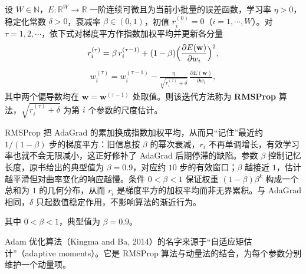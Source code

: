 \documentclass[../../main.tex]{subfiles}
\begin{document}
\begin{definition}[RMSProp]\label{definition:ch07-RMSProp}
设 $W\in\mathbb{N}$，$E:\mathbb{R}^{W}\to\mathbb{R}$ 一阶连续可微且为当前小批量的误差函数，学习率 $\eta>0$，稳定化常数 $\delta>0$，衰减率 $\beta\in(0,1)$，初值 $r_{i}^{(0)}=0$（$i=1,\cdots,W$）。对 $\tau=1,2,\cdots$，依下式对梯度平方作指数加权平均并更新各分量
\begin{align}
r_i^{(\tau)} = \beta\,r_i^{(\tau-1)}+(1-\beta)\Bigl(\frac{\partial E(\mathbf{w})}{\partial w_i}\Bigr)^{2},
\label{align:ch07-rmsprop}
\end{align}
\begin{align}
w_i^{(\tau)} = w_i^{(\tau-1)}-\frac{\eta}{\sqrt{r_i^{(\tau)}+\delta}}\,\frac{\partial E(\mathbf{w})}{\partial w_i},
\label{align:ch07-rmsprop更新}
\end{align}
其中两个偏导数均在 $\mathbf{w}=\mathbf{w}^{(\tau-1)}$ 处取值。则该迭代方法称为 \textbf{RMSProp} 算法，$\sqrt{r_{i}^{(\tau)}+\delta}$ 为第 $i$ 个参数的尺度估计。
\end{definition}

\begin{remark}
RMSProp 把 AdaGrad 的累加换成指数加权平均，从而只“记住”最近约 $1/(1-\beta)$ 步的梯度平方：旧信息按 $\beta$ 的幂次衰减，$r_i$ 不再单调增长，有效学习率也就不会无限减小，这正好修补了 AdaGrad 后期停滞的缺陷。参数 $\beta$ 控制记忆长度，原书给出的典型值为 $\beta=0.9$，对应约 $10$ 步的有效窗口；$\beta$ 越接近 $1$，估计越平滑但对曲率变化的响应越慢。条件 $0<\beta<1$ 保证权重 $(1-\beta)\beta^{k}$ 构成一个总和为 $1$ 的几何分布，从而 $r_i$ 是梯度平方的加权平均而非无界累积。与 AdaGrad 相同，$\delta$ 只起数值稳定作用，不影响算法的渐近行为。
\end{remark}

其中 $0<\beta<1$，典型值为 $\beta=0.9$。

Adam 优化算法（Kingma and Ba, 2014）的名字来源于“自适应矩估计”（adaptive moments）。它是 RMSProp 算法与动量法的结合，为每个参数分别维护一个动量项。
\end{document}
